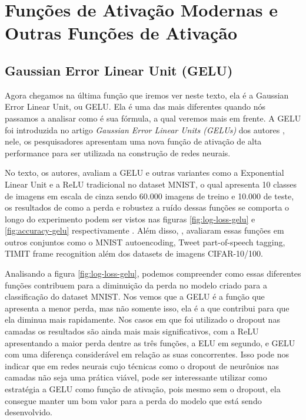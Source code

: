 
\chapter{Funções de Ativação Modernas e Outras Funções de Ativação}
\label{cap:ativacao-modernas-outras}

\section{Gaussian Error Linear Unit (GELU)}

Agora chegamos na última função que iremos ver neste texto, ela é a Gaussian Error Linear Unit, ou GELU. Ela é uma das mais diferentes quando nós passamos a analisar como é sua fórmula, a qual veremos mais em frente. A GELU foi introduzida no artigo \textit{Gaussian Error Linear Units (GELUs)} dos autores \textcite{GELUArticle}, nele, os pesquisadores apresentam uma nova função de ativação de alta performance para ser utilizada na construção de redes neurais.

No texto, os autores, avaliam a GELU e outras variantes como a Exponential Linear Unit e a ReLU tradicional no dataset MNIST, o qual apresenta 10 classes de imagens em escala de cinza sendo 60.000 imagens de treino e 10.000 de teste, os resultados de como a perda e robustez a ruído dessas funções se comporta o longo do experimento podem ser vistos nas figuras \ref{fig:log-loss-gelu} e \ref{fig:accuracy-gelu} respectivamente \parencite{GELUArticle}. Além disso, \textcite{GELUArticle}, avaliaram essas funções em outros conjuntos como o MNIST autoencoding, Tweet part-of-speech tagging, TIMIT frame recognition além dos datasets de imagens CIFAR-10/100. 

Analisando a figura \ref{fig:log-loss-gelu}, podemos compreender como essas diferentes funções contribuem para a diminuição da perda no modelo criado para a classificação do dataset MNIST. Nos vemos que a GELU é a função que apresenta a menor perda, mas não somente isso, ela é a que contribui para que ela diminua mais rapidamente. Nos casos em que foi utilizado o dropout nas camadas os resultados são ainda mais mais significativos, com a ReLU apresentando a maior perda dentre as três funções, a ELU em segundo, e GELU com uma diferença considerável em relação as suas concorrentes. Isso pode nos indicar que em redes neurais cujo técnicas como o dropout de neurônios nas camadas não seja uma prática viável, pode ser interessante utilizar como estratégia a GELU como função de ativação, pois mesmo sem o dropout, ela consegue manter um bom valor para a perda do modelo que está sendo desenvolvido.

